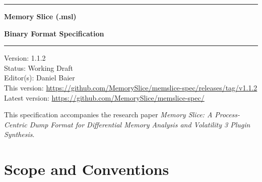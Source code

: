 \documentclass[11pt,a4paper]{article}
\begin{document}
\begin{titlepage}
\vspace*{3cm}
{\color{accent}\rule{\textwidth}{3pt}}\vspace{0.5cm}
{\Huge\bfseries\color{navy} Memory Slice (.msl)\par}\vspace{0.3cm}
{\LARGE\bfseries\color{accent} Binary Format Specification\par}\vspace{0.5cm}
{\color{muted!50}\rule{\textwidth}{0.5pt}}\vspace{1cm}
{\large\color{muted}
Version: 1.1.2\\[4pt]
Status: Working Draft\\[4pt]
Editor(s): Daniel Baier\\[4pt]
This version: {\footnotesize\url{https://github.com/MemorySlice/memslice-spec/releases/tag/v1.1.2}}\\[4pt]
Latest version: {\footnotesize\url{https://github.com/MemorySlice/memslice-spec/}}
}\vspace{1.5cm}
\begin{abstract}\noindent
Memory Slice (\texttt{.msl}) is a self-describing, block-based binary format for capturing the forensic state of a single operating system process. It records both the virtual address space (with per-page acquisition status) and transient OS-queryable metadata that exists only while the process is alive. This document specifies the binary layout: file header, block architecture, integrity chain, capture-time payloads, extension segments for post-acquisition enrichment, cross-referencing, capability bitmap, raw dump import mechanism, investigation mode with system-wide context capture, and full-container AEAD encryption with post-quantum key encapsulation support.
\end{abstract}

\vfill
{\small\color{muted}
This specification accompanies the research paper \emph{Memory Slice: A Process-Centric Dump Format for Differential Memory Analysis and Volatility 3 Plugin Synthesis}.}
\end{titlepage}

\tableofcontents\newpage

\section{Scope and Conventions}
\end{document}
